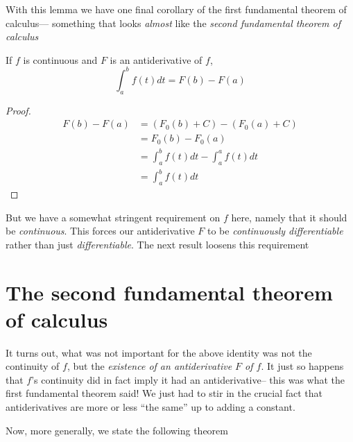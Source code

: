 \documentclass{article}
\begin{document}
With this lemma we have one final corollary of the first fundamental theorem of calculus--- something that looks \emph{almost} like the \textit{second fundamental theorem of calculus}

\begin{corollary}
    If $f$ is continuous and $F$ is an antiderivative of $f$,
    \[
        \int_a^b f(t)dt = F(b) - F(a)
    \]
\end{corollary}
\begin{proof}
    \begin{align*}
        F(b) - F(a) &= (F_0(b) + C) - (F_0(a) + C) \\
                    &= F_0(b) - F_0(a) \\
                    &= \int_a^b f(t)dt - \int_a^a f(t)dt \\
                    &= \int_a^bf(t)dt
    \end{align*}
\end{proof}


But we have a somewhat stringent requirement on $f$ here, namely that it should be \emph{continuous}. This forces our antiderivative $F$ to be \emph{continuously differentiable} rather than just \emph{differentiable}. The next result loosens this requirement 

\section{The second fundamental theorem of calculus}

It turns out, what was not important for the above identity was not the continuity of $f$, but the \emph{existence of an antiderivative $F$ of $f$}. It just so happens that $f$'s continuity did in fact imply it had an antiderivative-- this was what the first fundamental theorem said! We just had to stir in the crucial fact that antiderivatives are more or less ``the same'' up to adding a constant.

Now, more generally, we state the following theorem
\end{document}

